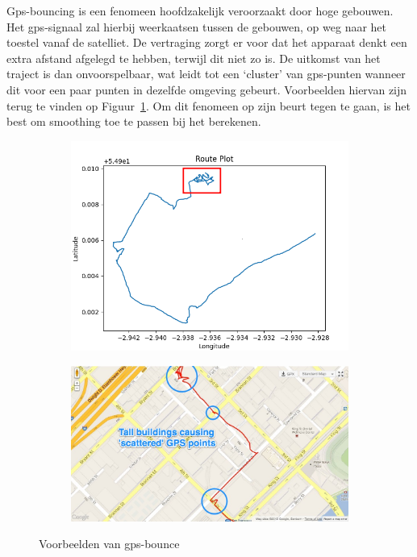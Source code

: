 Gps-bouncing is een fenomeen hoofdzakelijk veroorzaakt door hoge gebouwen. Het
\ac{gps}-signaal zal hierbij weerkaatsen tussen de gebouwen, op weg naar het
toestel vanaf de satelliet. De vertraging zorgt er voor dat het apparaat denkt
een extra afstand afgelegd te hebben, terwijl dit niet zo is. De uitkomst van
het traject is dan onvoorspelbaar, wat leidt tot een `cluster' van
\ac{gps}-punten wanneer dit voor een paar punten in dezelfde omgeving gebeurt.
Voorbeelden hiervan zijn terug te vinden op Figuur~\ref{fig:gps_bounce}. Om dit
fenomeen op zijn beurt tegen te gaan, is het best om smoothing toe te passen
bij het berekenen.
\begin{figure}
    \centering
    \begin{subfigure}[b]{0.49\textwidth}
        \centering
        \includegraphics[width=\textwidth]{fig/Afwijkingen&Analyses/Crooked Routes/Crooked GPS Route_Cart.png}
    \end{subfigure}
    \begin{subfigure}[b]{0.49\textwidth}
        \centering
        \includegraphics[width=\textwidth]{fig/Afwijkingen&Analyses/Crooked Routes/GPS_bounce_map.jpg}
    \end{subfigure}
    \caption{Voorbeelden van \ac{gps}-bounce~\cite{BadGPSDa19:online}}\label{fig:gps_bounce}
\end{figure}

